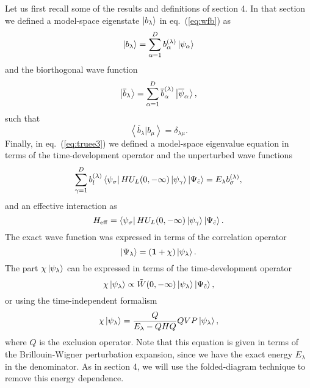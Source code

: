 Let us first recall some of the results and definitions of section 4.
In that section we defined a model-space eigenstate
$\left| b_{\lambda} \right\rangle$ in eq.\ (\ref{eq:wfb}) as
\[
     \left| b_{\lambda} \right\rangle=\sum_{\alpha =1}^{D}
     b_{\alpha}^{(\lambda )}\left| \psi_{\alpha} \right\rangle
\]
and the biorthogonal wave function
\[
     \left| \overline{b}_{\lambda} \right\rangle=\sum_{\alpha=1}^{D}
      \overline{b}_{\alpha}^{(\lambda )}
     \left| \overline{\psi}_{\alpha} \right\rangle,
\]
such that
\[
     {\left\langle \overline{b}_{\lambda} | b_{\mu} \right\rangle}=
     \delta_{\lambda\mu}.
\]
Finally, in
eq.\ (\ref{eq:truee3}) we defined a model-space eigenvalue equation
in terms of the time-development operator and the unperturbed
wave functions
\[
     {\displaystyle
     \sum_{\gamma =1}^{D}b_l^{(\lambda )}\left\langle \psi_{\sigma} \right|
     HU_L(0,-\infty )\left| \psi_{\gamma} \right\rangle\left| \Psi_{\tilde{c}} \right\rangle } =
     E_{\lambda}b_{\sigma}^{(\lambda )},
\]
and  an effective interaction as
\[
     H_{\mathrm{eff}}=
     \left\langle \psi_{\sigma} \right|
     HU_L(0,-\infty )\left| \psi_{\gamma} \right\rangle\left| \Psi_{\tilde{c}} \right\rangle .
\]
The exact wave function was expressed in terms of the correlation 
operator
\begin{equation}
      \left| \Psi_{\lambda} \right\rangle=({\bf 1}+\chi)\left| \psi_{\lambda} \right\rangle.
\end{equation}
The part $\chi\left| \psi_{\lambda} \right\rangle$ can be expressed in terms
of the time-development operator
\begin{equation}
  \chi\left| \psi_{\lambda} \right\rangle\propto   
  \tilde{W}(0,-\infty )\left| \psi_{\lambda} \right\rangle\left| \Psi_{\tilde{c}} \right\rangle ,
\end{equation}
or using the time-independent formalism
\begin{equation}
  \chi\left| \psi_{\lambda} \right\rangle=
  \frac{Q}{E_{\lambda}-QHQ}QVP\left| \psi_{\lambda} \right\rangle,
  \label{eq:newchi}
\end{equation}
where $Q$ is the exclusion operator. Note that this equation is given
in terms of the Brillouin-Wigner perturbation expansion, since
we have the exact energy $E_{\lambda}$ in the denominator.
As in section 4, we will use the folded-diagram technique to remove
this energy dependence.

